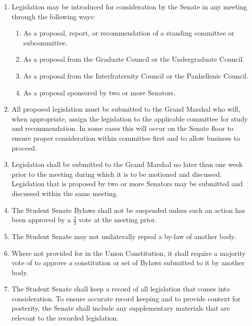 \documentclass{bylaws}
\begin{document}
\begin{enumerate}
\item Legislation may be introduced for consideration by the Senate in any meeting through the following ways:
\begin{enumerate}
\item As a proposal, report, or recommendation of a standing committee or subcommittee.
\item As a proposal from the Graduate Council or the Undergraduate Council.
\item As a proposal from the Interfraternity Council or the Panhellenic Council.
\item As a proposal sponsored by two or more Senators.
\end{enumerate}
\item All proposed legislation must be submitted to the Grand Marshal who will, when appropriate, assign the legislation to the
applicable committee for study and recommendation. In some cases this will occur on the Senate floor to ensure proper
consideration within committee first and to allow business to proceed.
\item Legislation shall be submitted to the Grand Marshal no later than one week prior to the meeting during which it is to be
motioned and discussed. Legislation that is proposed by two or more Senators may be submitted and discussed within the same
meeting.
\item The Student Senate Bylaws shall not be suspended unless such an action has been approved by a $\frac{2}{3}$ vote at the meeting prior.
\item The Student Senate may not unilaterally repeal a by-law of another body.
\item Where not provided for in the Union Constitution, it shall require a majority vote of to approve a constitution or set of Bylaws
submitted to it by another body.
\item The Student Senate shall keep a record of all legislation that comes into consideration. To ensure accurate record keeping and to
provide context for posterity, the Senate shall include any supplementary materials that are relevant to the recorded legislation. \end{enumerate}
\end{document}
